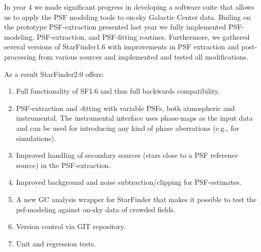 In year 4 we made significant progress in developing a software suite that allows us to apply the PSF modeling tools to on-sky Galactic Center data. Builing on the prototype PSF-extraction presented last year we fully implemented PSF-modeling, PSF-extraction, and PSF-fitting routines. Furthermore, we gathered several versions of StarFinder1.6 with improvements in PSF extraction and post-processing from various sources and implemented and tested all modifications.

As a result StarFinder2.0 offers:
\begin{enumerate}
\item Full functionality of SF1.6 and thus full backwards compatibility.
\item PSF-extraction and -fitting with variable PSFs, both atmospheric and instrumental. The instrumental interface uses phase-maps as the input data and can be used for introducing any kind of phase aberrations (e.g., for simulations).
\item Improved handling of secondary sources (stars close to a PSF reference source) in the PSF-extraction.
\item Improved background and noise subtraction/clipping for PSF-estimates.
\item A new GC analysis wrapper for StarFinder that makes it possible to test the psf-modeling against on-sky data of crowded fields.
\item Version control via GIT repository.
\item Unit and regression tests.
\end{enumerate}
  
  
  